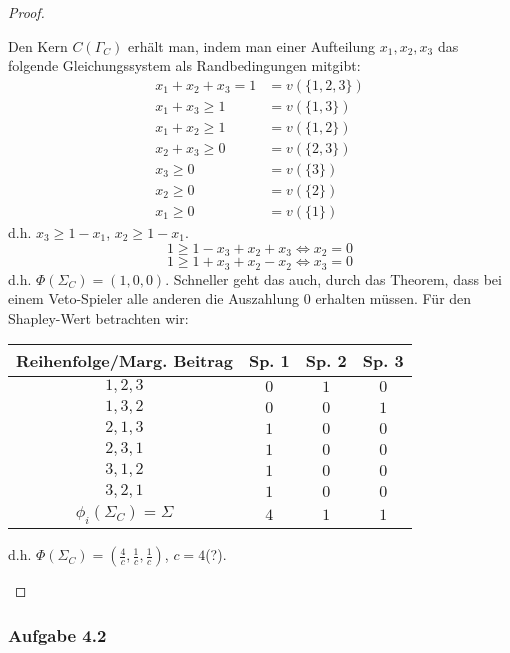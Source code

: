\documentclass[12pt]{extreport} %
\theoremstyle{named}
\theoremstyle{itshape}
\theoremstyle{normal}
\begin{document}
\begin{enumerate}
\begin{proof}
\begin{enumerate}
			Den Kern $C(\Gamma_C)$ erhält man, indem man einer Aufteilung $x_1, x_2, x_3$ das folgende Gleichungssystem als Randbedingungen mitgibt:
			\begin{align*}
				x_{1} + x_{2} + x_{3} = 1 & = v(\{1, 2, 3 \}) \\
				x_{1} + x_{3} \geq 1 & = v(\{1, 3 \}) \\
				x_{1} + x_{2} \geq 1 & = v(\{ 1, 2 \}) \\
				x_{2} + x_{3} \geq 0 & = v(\{ 2, 3 \}) \\
				x_{3} \geq 0 & = v(\{ 3 \}) \\
			    x_{2} \geq 0 & = v(\{ 2 \}) \\
				x_{1} \geq 0 & = v(\{ 1 \})
			\end{align*}
			d.h. $x_{3} \geq 1 - x_{1}$, $x_{2} \geq 1- x_{1}$.
			$$ 1 \geq 1 - x_{3} + x_{2} + x_{3} \iff x_{2} = 0$$
			$$ 1 \geq 1 + x_{3} + x_{2} - x_{2} \iff x_{3} = 0$$
    		d.h. $\Phi(\Sigma_{C}) = \left(1, 0, 0 \right)$. Schneller geht das auch, durch das Theorem, dass bei einem Veto-Spieler alle anderen die Auszahlung $0$ erhalten müssen. Für den Shapley-Wert betrachten wir:
  			\begin{center}
    			\begin{tabular}{| c | c | c | c |}
   					\hline
    					Reihenfolge/Marg. Beitrag &  Sp. 1 & Sp. 2 & Sp. 3  \\ 
    						\hline
    					$1, 2, 3$ & $0$ & $1$ & $0$  \\ 
    						\hline
    					$1, 3, 2$ & $0$ & $0$ & $1$  \\
    						\hline
    					$2, 1, 3$ & $1$ & $0$ & $0$  \\
       						\hline
    					$2, 3, 1$ & $1$ & $0$ & $0$  \\
      						\hline
    					$3, 1, 2$ & $1$ & $0$ & $0$  \\
      						\hline
    					$3, 2, 1$ & $1$ & $0$ & $0$  \\
      						\hline \hline
    					$\phi_{i}(\Sigma_{C}) = \Sigma$  & $4$ & $1$ & $1$  \\
    				\hline
   				 \end{tabular}
    		\end{center}
    		d.h. $\Phi(\Sigma_{C}) = \left(\frac{4}{c}, \frac{1}{c}, \frac{1}{c} \right)$, $c = 4$(?).
		\end{enumerate}
	\end{proof}
\end{enumerate}

\subsubsection*{Aufgabe 4.2}
 
\end{document}
